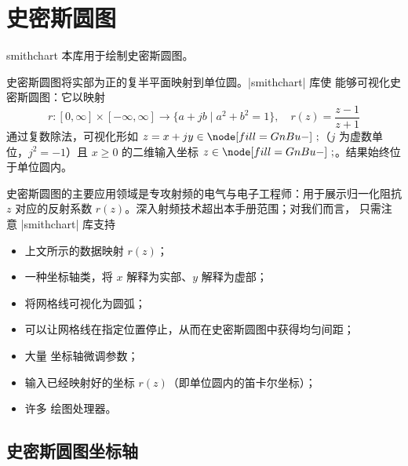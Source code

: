 
\section{史密斯圆图}
\label{sec:smithcharts}

\begingroup
\def\pgfplotsmanualcurlibrary{smithchart}

\begin{pgfplotslibrary}{smithchart}
    本库用于绘制史密斯圆图。

    史密斯圆图将实部为正的复半平面映射到单位圆。|smithchart| 库使 \PGFPlots{}
    能够可视化史密斯圆图：它以映射
        \[
            r\colon [0,\infty] \times [-\infty,\infty] \to
                \{ a+j b \;\vert\;  a^2 + b^2 = 1 \},
                    \quad r(z) = \frac{z-1}{z+1}
        \]
    通过复数除法，可视化形如 $z = x+ j y \in \C$（$j$ 为虚数单位，$j^2=-1$）且
    $x \ge 0$ 的二维输入坐标 $z \in \C$。结果始终位于单位圆内。

    史密斯圆图的主要应用领域是专攻射频的电气与电子工程师：用于展示归一化阻抗
    $z$ 对应的反射系数 $r(z)$。深入射频技术超出本手册范围；对我们而言，
    只需注意 |smithchart| 库支持
    \begin{itemize}
        \item 上文所示的数据映射 $r(z)$；
        \item 一种坐标轴类，将 $x$ 解释为实部、$y$ 解释为虚部；
        \item 将网格线可视化为圆弧；
        \item 可以让网格线在指定位置停止，从而在史密斯圆图中获得均匀间距；
        \item 大量 \PGFPlots{} 坐标轴微调参数；
        \item 输入已经映射好的坐标 $r(z)$（即单位圆内的笛卡尔坐标）；
        \item 许多 \PGFPlots{} 绘图处理器。
    \end{itemize}
\end{pgfplotslibrary}


\subsection{史密斯圆图坐标轴}

